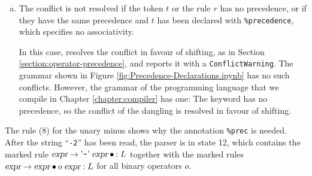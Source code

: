 \begin{enumerate}[(a)]
      In this case we have a syntax error:
      \\[0.2cm]
      \hspace*{1.3cm}
      $\textsl{action}(s,t) := \texttt{error}$.
      \\[0.2cm]
      To understand this case, consider the string ``\texttt{1<2<3}''.  After ``\texttt{1<2}'' has been read and
      the next token is \saquoted{<}, the parser is in state 17, which contains the marked rules
      \\[0.2cm]
      \hspace*{1.3cm}
      $\textsl{expr} \rightarrow \textsl{expr} \aquoted{<} \textsl{expr} \mdot: L$ \quad and \quad
      $\textsl{expr} \rightarrow \textsl{expr} \mdot \saquoted{<}\; \textsl{expr}: L$.
      \\[0.2cm]
      As $p(\saquoted{<}) = 1 = p(1)$ and \saquoted{<} is non-associative, the parser recognizes that the second
      \saquoted{<} is a syntax error.  The same holds for the token \saquoted{==}, which has the same precedence:
      ``\texttt{1<2==3}'' is a syntax error, too.  The output file lists these entries of the action table as
      ``\texttt{error~(nonassociative)}''.
\item The conflict is not resolved if the token $t$ or the rule $r$ has no precedence, or if they have the same
      precedence and $t$ has been declared with \texttt{\%precedence}, which specifies no associativity.

      In this case,  resolves the conflict in favour of shifting, as in Section
      \ref{section:operator-precedence}, and reports it with a \texttt{ConflictWarning}.  The grammar shown in
      Figure \ref{fig:Precedence-Declarations.ipynb} has no such conflicts.  However, the grammar of the
      programming language that we compile in Chapter \ref{chapter:compiler} has one:  The keyword
       has no precedence, so the conflict of the dangling  is resolved in favour of
      shifting.
\end{enumerate}
The rule (8) for the unary minus shows why the annotation \texttt{\%prec} is needed.  After the string
``\texttt{-2}'' has been read, the parser is in state 12, which contains the marked rule
$\textsl{expr} \rightarrow \saquoted{-}\; \textsl{expr} \mdot: L$ together with the marked rules
$\textsl{expr} \rightarrow \textsl{expr} \mdot o\; \textsl{expr}: L$ for all binary operators $o$.
